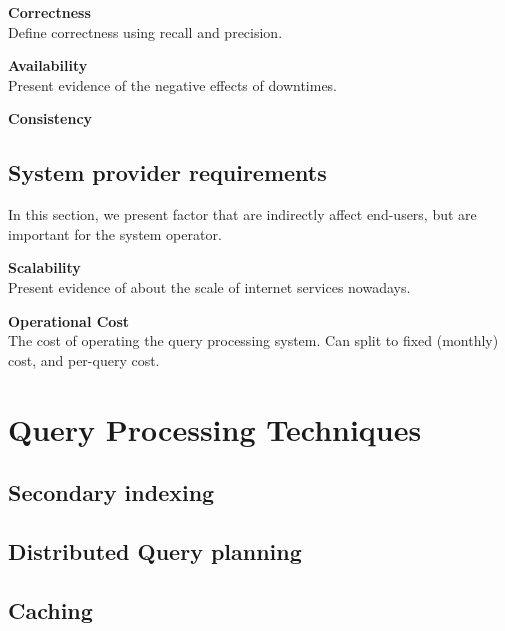 \textbf{Correctness} \\
  Define correctness using recall and precision.

\textbf{Availability} \\
  Present evidence of the negative effects of downtimes.

\textbf{Consistency}

\subsection{System provider requirements}
In this section, we present factor that are indirectly affect end-users, but are
important for the system operator.

\textbf{Scalability} \\
Present evidence of about the scale of internet services nowadays.

\textbf{Operational Cost} \\
The cost of operating the query processing system.
Can split to fixed (monthly) cost, and per-query cost.


\section{Query Processing Techniques}

\subsection{Secondary indexing}

\subsection{Distributed Query planning}

\subsection{Caching}